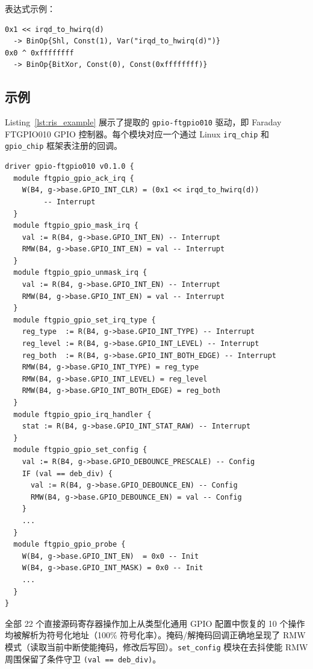 \documentclass[sigplan, screen, review, anonymous]{acmart}
\newcommand{\rislang}{RIS}
\begin{document}
表达式示例：
\begin{lstlisting}[breaklines=true]
0x1 << irqd_to_hwirq(d)
  -> BinOp{Shl, Const(1), Var("irqd_to_hwirq(d)")}
0x0 ^ 0xffffffff
  -> BinOp{BitXor, Const(0), Const(0xffffffff)}
\end{lstlisting}

\subsection{示例}

Listing~\ref{lst:ris_example} 展示了提取的 \texttt{gpio-ftgpio010} 驱动，即 Faraday FTGPIO010 GPIO 控制器。每个模块对应一个通过 Linux \texttt{irq\_chip} 和 \texttt{gpio\_chip} 框架表注册的回调。

\begin{lstlisting}[language=ris,label={lst:ris_example},caption={gpio-ftgpio010 的提取 \rislang 规约节选（14 个模块，32 个操作，包括通用库摘要）}]
driver gpio-ftgpio010 v0.1.0 {
  module ftgpio_gpio_ack_irq {
    W(B4, g->base.GPIO_INT_CLR) = (0x1 << irqd_to_hwirq(d))
         -- Interrupt
  }
  module ftgpio_gpio_mask_irq {
    val := R(B4, g->base.GPIO_INT_EN) -- Interrupt
    RMW(B4, g->base.GPIO_INT_EN) = val -- Interrupt
  }
  module ftgpio_gpio_unmask_irq {
    val := R(B4, g->base.GPIO_INT_EN) -- Interrupt
    RMW(B4, g->base.GPIO_INT_EN) = val -- Interrupt
  }
  module ftgpio_gpio_set_irq_type {
    reg_type  := R(B4, g->base.GPIO_INT_TYPE) -- Interrupt
    reg_level := R(B4, g->base.GPIO_INT_LEVEL) -- Interrupt
    reg_both  := R(B4, g->base.GPIO_INT_BOTH_EDGE) -- Interrupt
    RMW(B4, g->base.GPIO_INT_TYPE) = reg_type
    RMW(B4, g->base.GPIO_INT_LEVEL) = reg_level
    RMW(B4, g->base.GPIO_INT_BOTH_EDGE) = reg_both
  }
  module ftgpio_gpio_irq_handler {
    stat := R(B4, g->base.GPIO_INT_STAT_RAW) -- Interrupt
  }
  module ftgpio_gpio_set_config {
    val := R(B4, g->base.GPIO_DEBOUNCE_PRESCALE) -- Config
    IF (val == deb_div) {
      val := R(B4, g->base.GPIO_DEBOUNCE_EN) -- Config
      RMW(B4, g->base.GPIO_DEBOUNCE_EN) = val -- Config
    }
    ...
  }
  module ftgpio_gpio_probe {
    W(B4, g->base.GPIO_INT_EN)  = 0x0 -- Init
    W(B4, g->base.GPIO_INT_MASK) = 0x0 -- Init
    ...
  }
}
\end{lstlisting}

全部 22 个直接源码寄存器操作加上从类型化通用 GPIO 配置中恢复的 10 个操作均被解析为符号化地址（100\% 符号化率）。掩码/解掩码回调正确地呈现了 RMW 模式（读取当前中断使能掩码，修改后写回）。\texttt{set\_config} 模块在去抖使能 RMW 周围保留了条件守卫 \texttt{(val == deb\_div)}。
\end{document}
